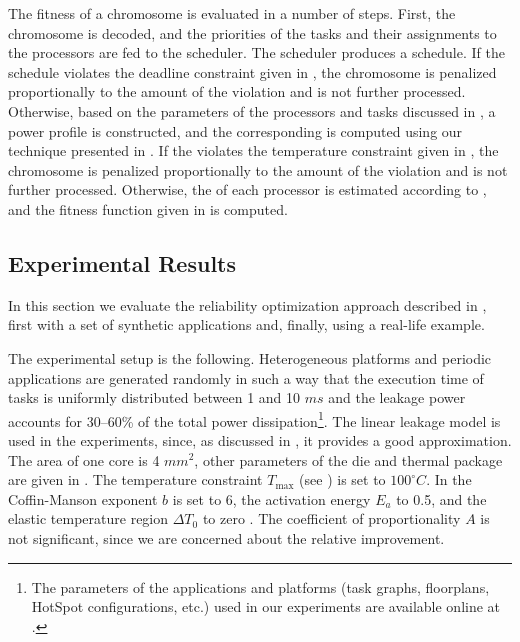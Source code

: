 The fitness of a chromosome is evaluated in a number of steps. First, the
chromosome is decoded, and the priorities of the tasks and their assignments to
the processors are fed to the scheduler. The scheduler produces a schedule. If
the schedule violates the deadline constraint given in
, the chromosome is penalized proportionally
to the amount of the violation and is not further processed. Otherwise, based on
the parameters of the processors and tasks discussed in , a
power profile \mp is constructed, and the corresponding  \mq is
computed using our technique presented in .
If the  violates the temperature constraint given in
, the chromosome is penalized proportionally
to the amount of the violation and is not further processed. Otherwise, the
 of each processor is estimated according to
, and the fitness function given in
 is computed.

\subsection{Experimental Results}

In this section we evaluate the reliability optimization approach described in
, first with a set of synthetic applications and,
finally, using a real-life example.

The experimental setup is the following. Heterogeneous platforms and periodic
applications are generated randomly \cite{dick1998} in such a way that the
execution time of tasks is uniformly distributed between 1 and 10 $ms$ and the
leakage power accounts for 30--60\% of the total power dissipation\footnote{The
parameters of the applications and platforms (task graphs, floorplans, HotSpot
configurations, etc.) used in our experiments are available online at
\cite{liu2011}.}. The linear leakage model is used in the experiments, since, as
discussed in , it provides a good
approximation. The area of one core is 4 $mm^2$, other parameters of the die and
thermal package are given in . The temperature constraint
$T_\text{max}$ (see ) is set to $100^\circ C$.
In  the Coffin-Manson exponent $b$ is set to 6,
the activation energy $E_a$ to 0.5, and the elastic temperature region $\Delta
T_0$ to zero \cite{jedec2010}. The coefficient of proportionality $A$ is not
significant, since we are concerned about the relative improvement.

